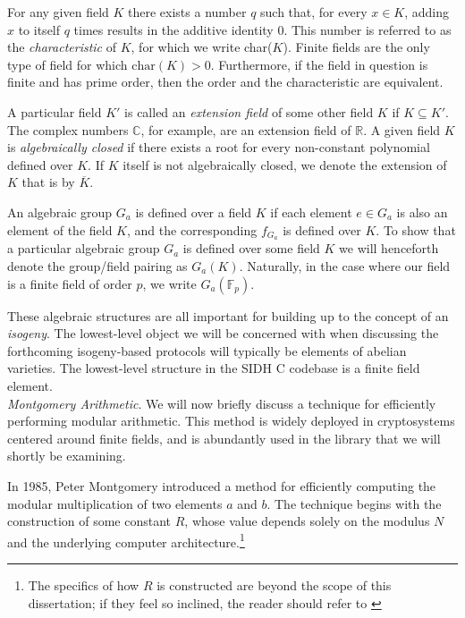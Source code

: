 For any given field $K$ there exists a number $q$ such that, for every $x \in K$, adding $x$ to itself $q$ times results in the additive identity 0. This number is referred to as the \emph{characteristic} of $K$, for which we write char($K$). Finite fields are the only type of field for which $\text{char}(K) > 0$. Furthermore, if the field in question is finite and has prime order, then the order and the characteristic are equivalent.

A particular field $K'$ is called an \emph{extension field} of some other field $K$ if $K \subseteq K'$. The complex numbers $\mathbb{C}$, for example, are an extension field of $\mathbb{R}$. A given field $K$ is \emph{algebraically closed} if there exists a root for every non-constant polynomial defined over $K$. If $K$ itself is not algebraically closed, we denote the extension of $K$ that is by $\overline{K}$. 

An algebraic group $G_a$ is defined over a field $K$ if each element $e \in G_a$ is also an element of the field $K$, and the corresponding $f_{G_a}$ is defined over $K$. To show that a particular algebraic group $G_a$ is defined over some field $K$ we will henceforth denote the group/field pairing as $G_a(K)$. Naturally, in the case where our field is a finite field of order $p$, we write $G_a(\mathbb{F}_p)$.

These algebraic structures are all important for building up to the concept of an \emph{isogeny}. The lowest-level object we will be concerned with when discussing the forthcoming isogeny-based protocols will typically be elements of abelian varieties. The lowest-level structure in the SIDH C codebase is a finite field element.\\

\noindent
\emph{Montgomery Arithmetic}\label{snip:montgomery}. We will now briefly discuss a technique for efficiently performing modular arithmetic. This method is widely deployed in cryptosystems centered around finite fields, and is abundantly used in the \sidh library that we will shortly be examining.

In 1985, Peter Montgomery introduced a method for efficiently computing the modular multiplication of two elements $a$ and $b$. The technique begins with the construction of some constant $R$, whose value depends solely on the modulus $N$ and the underlying computer architecture.\footnote{The specifics of how $R$ is constructed are beyond the scope of this dissertation; if they feel so inclined, the reader should refer to \cite{mont}}


